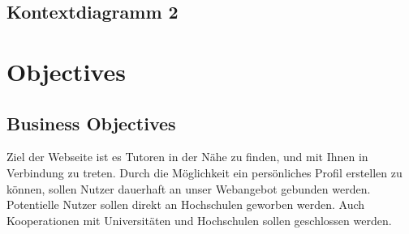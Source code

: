 \documentclass[10pt,a4paper]{scrartcl}
\begin{document}
\subsection{Kontextdiagramm 2}

\section{Objectives} 

\subsection{Business Objectives}
Ziel der Webseite ist es Tutoren in der Nähe zu finden, und mit Ihnen in 
Verbindung zu treten. Durch die Möglichkeit ein persönliches Profil erstellen zu 
können, sollen Nutzer dauerhaft an unser Webangebot gebunden werden. 
Potentielle Nutzer sollen direkt an Hochschulen geworben werden. Auch 
Kooperationen mit Universitäten und Hochschulen sollen geschlossen werden.
\end{document}
